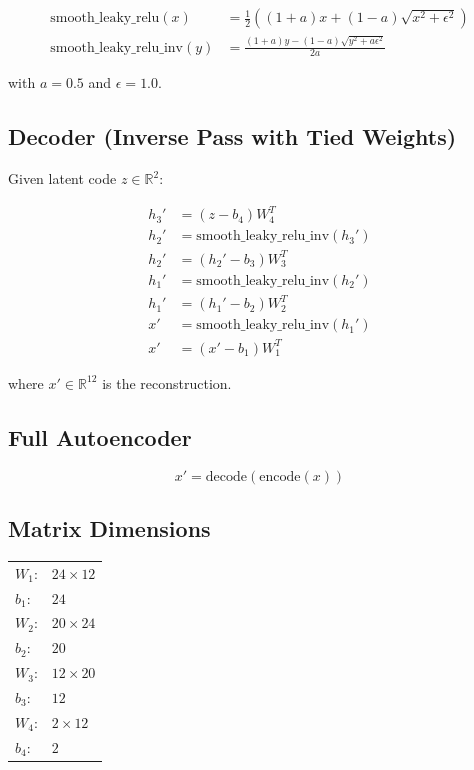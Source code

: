 \documentclass{article}
\begin{document}
\begin{align*}
    \text{smooth\_leaky\_relu}(x) &= \frac{1}{2} \left((1 + a)x + (1 - a)\sqrt{x^2 + \epsilon^2}\right) \\
    \text{smooth\_leaky\_relu\_inv}(y) &= \frac{(1 + a)y - (1 - a)\sqrt{y^2 + a \epsilon^2}}{2a}
\end{align*}

with $a = 0.5$ and $\epsilon = 1.0$.

\subsection*{Decoder (Inverse Pass with Tied Weights)}

Given latent code $z \in \mathbb{R}^2$:

\begin{align*}
    h_3' &= (z - b_4) W_4^T \\
    h_2' &= \text{smooth\_leaky\_relu\_inv}(h_3') \\
    h_2' &= (h_2' - b_3) W_3^T \\
    h_1' &= \text{smooth\_leaky\_relu\_inv}(h_2') \\
    h_1' &= (h_1' - b_2) W_2^T \\
    x' &= \text{smooth\_leaky\_relu\_inv}(h_1') \\
    x' &= (x' - b_1) W_1^T
\end{align*}

where $x' \in \mathbb{R}^{12}$ is the reconstruction.

\subsection*{Full Autoencoder}

\begin{equation*}
    x' = \text{decode}(\text{encode}(x))
\end{equation*}

\subsection*{Matrix Dimensions}

\begin{tabular}{ll}
    $W_1$: & $24 \times 12$ \\
    $b_1$: & $24$ \\
    $W_2$: & $20 \times 24$ \\
    $b_2$: & $20$ \\
    $W_3$: & $12 \times 20$ \\
    $b_3$: & $12$ \\
    $W_4$: & $2 \times 12$ \\
    $b_4$: & $2$ \\
\end{tabular}
\end{document}
